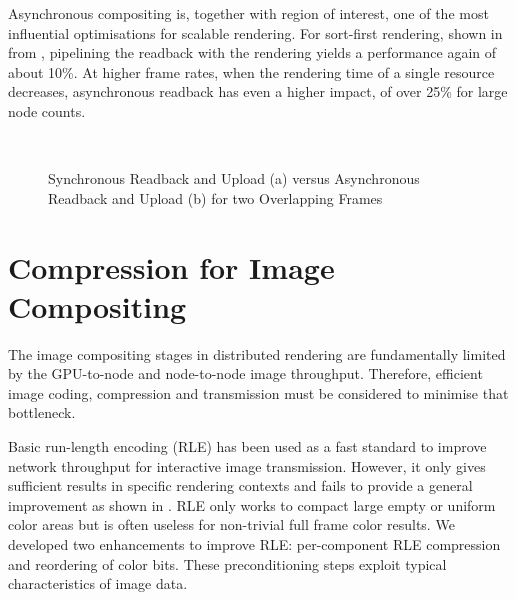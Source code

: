 Asynchronous compositing is, together with region of interest, one of the most
influential optimisations for scalable rendering. For sort-first rendering,
shown in  from \cite{EBAHMP:12}, pipelining the readback with the
rendering yields a performance again of about 10\%. At higher frame rates, when
the rendering time of a single resource decreases, asynchronous readback has
even a higher impact, of over 25\% for large node counts.

\begin{figure}[t]\center
  \\
  \caption{Synchronous Readback and Upload (a) versus
    Asynchronous Readback and Upload (b) for two Overlapping Frames}
\end{figure}


\section{Compression for Image Compositing}

The image compositing stages in distributed rendering are fundamentally limited
by the GPU-to-node and node-to-node image throughput. Therefore, efficient
image coding, compression and transmission must be considered to minimise that
bottleneck.

Basic run-length encoding (RLE) has been used as a fast standard to improve
network throughput for interactive image transmission. However, it only gives
sufficient results in specific rendering contexts and fails to provide a
general improvement as shown in \cite{MEP:10}. RLE only works to compact large
empty or uniform color areas but is often useless for non-trivial full frame
color results. We developed two enhancements to improve RLE: per-component RLE
compression and reordering of color bits. These preconditioning steps exploit
typical characteristics of image data.

